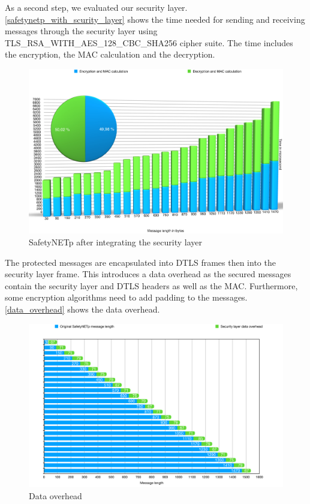 As a second step, we evaluated our security layer.
\autoref{safetynetp_with_scurity_layer} shows the time needed for sending and receiving messages through the
security layer using TLS\_RSA\_WITH\_AES\_128\_CBC\_SHA256 cipher suite. The time includes the encryption, the MAC
calculation and the decryption.

\begin{figure}[H]
\centering
\includegraphics[width=19cm,frame]{figures/realization/safetynetp_with_scurity_layer.jpg}
\caption{SafetyNETp after integrating the security layer}\label{safetynetp_with_scurity_layer}
\end{figure}

The protected messages are encapsulated into DTLS frames then into the security layer frame. This introduces
a data overhead as the secured messages contain the security layer and DTLS headers as well as the MAC.
Furthermore, some encryption algorithms need to add padding to the messages. \autoref{data_overhead} shows the
data overhead.

\begin{figure}[H]
\centering
\includegraphics[width=19cm,frame]{figures/realization/data_overhead.jpg}
\caption{Data overhead}\label{data_overhead}
\end{figure}

